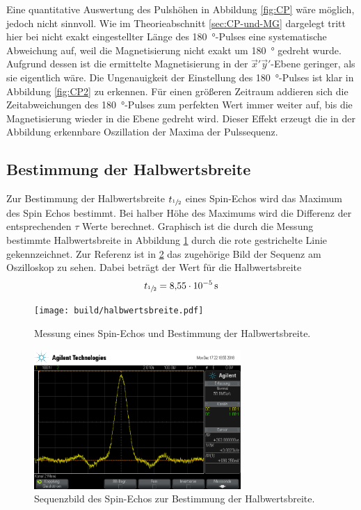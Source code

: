 Eine quantitative Auswertung des Pulshöhen in Abbildung \ref{fig:CP} wäre möglich,
jedoch nicht sinnvoll.
Wie im Theorieabschnitt \ref{sec:CP-und-MG} dargelegt tritt hier bei nicht
exakt eingestellter Länge des \SI{180}{\degree}-Pulses eine systematische
Abweichung auf, weil die Magnetisierung nicht exakt um \SI{180}{\degree}
gedreht wurde.
Aufgrund dessen ist die ermittelte Magnetisierung in der $\vec{x}'\vec{y}'$-Ebene
geringer, als sie eigentlich wäre.
Die Ungenauigkeit der Einstellung des \SI{180}{\degree}-Pulses ist klar in
Abbildung \ref{fig:CP2} zu erkennen.
Für einen größeren Zeitraum addieren sich die Zeitabweichungen des \SI{180}{\degree}-Pulses
zum perfekten Wert immer weiter auf, bis die Magnetisierung wieder in die
Ebene gedreht wird.
Dieser Effekt erzeugt die in der Abbildung erkennbare Oszillation der
Maxima der Pulssequenz.
\FloatBarrier


\subsection{Bestimmung der Halbwertsbreite}
Zur Bestimmung der Halbwertsbreite $t_{\sfrac{1}{2}}$ eines Spin-Echos wird das
Maximum des Spin Echos bestimmt. Bei halber Höhe des Maximums wird die Differenz
der entsprechenden $\tau$ Werte berechnet. Graphisch ist die durch die Messung
bestimmte Halbwertsbreite in Abbildung \ref{plt:t12} durch die rote gestrichelte
Linie gekennzeichnet.
Zur Referenz ist in \ref{fig:t12} das zugehörige Bild der Sequenz am Oszilloskop zu sehen.
Dabei beträgt der Wert für die Halbwertsbreite
\begin{align*}
  t_{\sfrac{1}{2}} = \SI{8.55e-5}{\second}
\end{align*}
\begin{figure}[htb]
  \centering
  \texttt{[image: build/halbwertsbreite.pdf]}
  \caption{Messung eines Spin-Echos und Bestimmung der Halbwertsbreite.}
  \label{plt:t12}
\end{figure}
\begin{figure}[htb]
  \centering
  \includegraphics[width=0.7\textwidth]{rohdaten/halbwertsbreite.png}
  \caption{Sequenzbild des Spin-Echos zur Bestimmung der Halbwertsbreite.}
  \label{fig:t12}
\end{figure}
\FloatBarrier

